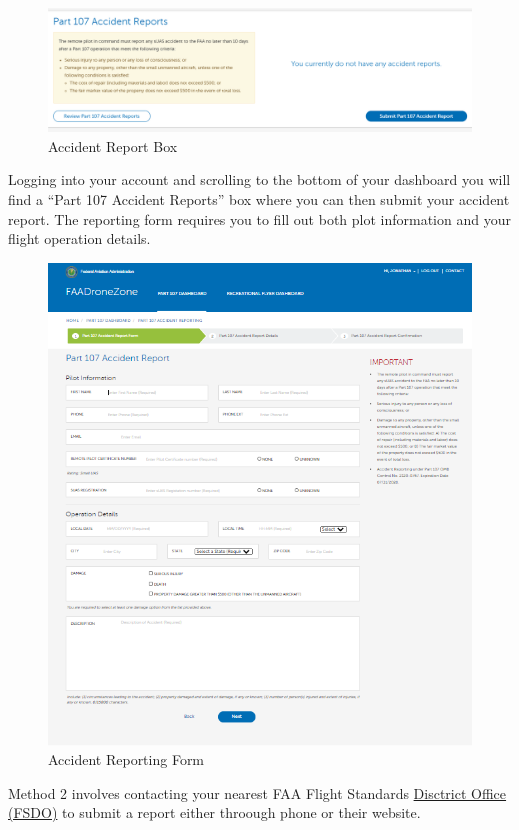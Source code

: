 \documentclass[
]{book}
\begin{document}
\begin{figure}
\centering
\includegraphics{images/DroneZone_AccidentReport.png}
\caption{Accident Report Box}
\end{figure}

Logging into your account and scrolling to the bottom of your dashboard you will find a ``Part 107 Accident Reports'' box where you can then submit your accident report. The reporting form requires you to fill out both plot information and your flight operation details.

\begin{figure}
\centering
\includegraphics{images/DroneZone_Accident_Form.png}
\caption{Accident Reporting Form}
\end{figure}

Method 2 involves contacting your nearest FAA Flight Standards \href{https://www.faa.gov/about/office_org/field_offices/fsdo/}{Disctrict Office (FSDO)} to submit a report either throough phone or their website.
\end{document}

